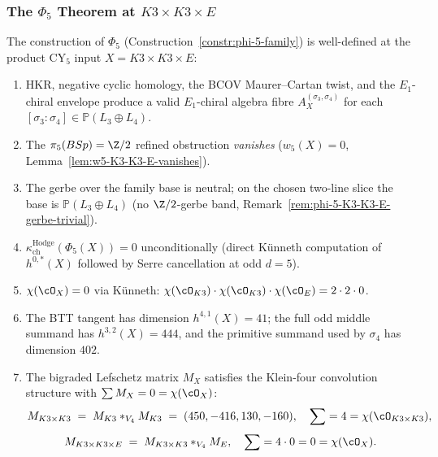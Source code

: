 \subsubsection{The \texorpdfstring{$\Phi_5$}{Phi-5} Theorem at \texorpdfstring{$K3 \times K3 \times E$}{K3 x K3 x E}}
\label{subsubsec:phi-5-K3-K3-E-theorem}

\begin{theorem}
\label{thm:phi-5-construction-K3K3E}
%
The construction of $\Phi_5$
\textup{(}Construction~\ref{constr:phi-5-family}\textup{)} is well-defined at
the product CY${}_5$ input $X = K3 \times K3 \times E$:
\begin{enumerate}[label=\textup{(}\roman*\textup{)}]
 \item HKR, negative cyclic homology, the BCOV Maurer--Cartan twist, and the
 $E_1$-chiral envelope produce
 a valid $E_1$-chiral algebra fibre $A^{(\sigma_3, \sigma_4)}_X$ for each
 $[\sigma_3 : \sigma_4] \in \mathbb{P}(L_3\oplus L_4)$.
 \item The $\pi_5(BSp) = \Z/2$ refined obstruction \emph{vanishes}
 \textup{(}$w_5(X) = 0$, Lemma~\ref{lem:w5-K3-K3-E-vanishes}\textup{)}.
 \item The gerbe over the family base is neutral; on the chosen two-line slice
 the base is \(\mathbb P(L_3\oplus L_4)\)
 \textup{(}no $\Z/2$-gerbe band, Remark~\ref{rem:phi-5-K3-K3-E-gerbe-trivial}\textup{)}.
 \item $\kappa_{\mathrm{ch}}^{\mathrm{Hodge}}(\Phi_5(X)) = 0$ unconditionally
 \textup{(}direct K\"unneth computation of $h^{0,*}(X)$ followed by
 Serre cancellation at odd $d = 5$\textup{)}.
 \item $\chi(\cO_X) = 0$ via K\"unneth: $\chi(\cO_{K3}) \cdot
 \chi(\cO_{K3}) \cdot \chi(\cO_E) = 2 \cdot 2 \cdot 0$.
 \item The BTT tangent has dimension \(h^{4,1}(X)=41\); the full odd middle
 summand has \(h^{3,2}(X)=444\), and the primitive summand used by
 \(\sigma_4\) has dimension \(402\).
 \item The bigraded Lefschetz matrix $M_X$ satisfies the Klein-four
 convolution structure with $\sum M_X = 0 = \chi(\cO_X)$:
 \[
 M_{K3 \times K3} \;=\; M_{K3} *_{V_4} M_{K3} \;=\; (450, -416, 130, -160),
 \quad \sum = 4 = \chi(\cO_{K3 \times K3}),
 \]
 \[
 M_{K3 \times K3 \times E} \;=\; M_{K3 \times K3} *_{V_4} M_E,
 \quad \sum = 4 \cdot 0 = 0 = \chi(\cO_{X}).
 \]
\end{enumerate}
\end{theorem}

